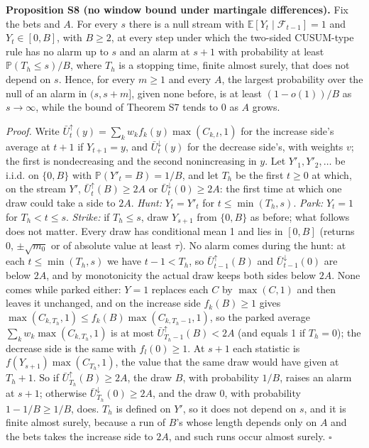 \documentclass[
]{article}
\begin{document}
\textbf{Proposition S8 (no window bound under martingale differences).}
Fix the bets and \(A\). For every \(s\) there is a null stream with
\(\mathbb{E}[Y_t \mid \mathcal{F}_{t-1}] = 1\) and \(Y_t \in [0, B]\),
with \(B \ge 2\), at every step under which the two-sided CUSUM-type
rule has no alarm up to \(s\) and an alarm at \(s + 1\) with probability
at least \(\mathbb{P}(T_h \le s)/B\), where \(T_h\) is a stopping time,
finite almost surely, that does not depend on \(s\). Hence, for every
\(m \ge 1\) and every \(A\), the largest probability over the null of an
alarm in \((s, s + m]\), given none before, is at least \((1 - o(1))/B\)
as \(s \to \infty\), while the bound of Theorem S7 tends to 0 as \(A\)
grows.

\emph{Proof.} Write
\(\bar U^{\uparrow}_t(y) = \sum_k w_k f_k(y)\max(C_{k,t}, 1)\) for the
increase side's average at \(t + 1\) if \(Y_{t+1} = y\), and
\(\bar U^{\downarrow}_t(y)\) for the decrease side's, with weights
\(v\); the first is nondecreasing and the second nonincreasing in \(y\).
Let \(Y'_1, Y'_2, \dots\) be i.i.d. on \(\lbrace 0, B\rbrace\) with
\(\mathbb{P}(Y'_t = B) = 1/B\), and let \(T_h\) be the first \(t \ge 0\)
at which, on the stream \(Y'\), \(\bar U^{\uparrow}_t(B) \ge 2A\) or
\(\bar U^{\downarrow}_t(0) \ge 2A\): the first time at which one draw
could take a side to \(2A\). \emph{Hunt:} \(Y_t = Y'_t\) for
\(t \le \min(T_h, s)\). \emph{Park:} \(Y_t = 1\) for \(T_h < t \le s\).
\emph{Strike:} if \(T_h \le s\), draw \(Y_{s+1}\) from
\(\lbrace 0, B\rbrace\) as before; what follows does not matter. Every
draw has conditional mean 1 and lies in \([0, B]\) (returns 0,
\(\pm\sqrt{m_0}\) or of absolute value at least \(\tau\)). No alarm
comes during the hunt: at each \(t \le \min(T_h, s)\) we have
\(t - 1 < T_h\), so \(\bar U^{\uparrow}_{t-1}(B)\) and
\(\bar U^{\downarrow}_{t-1}(0)\) are below \(2A\), and by monotonicity
the actual draw keeps both sides below \(2A\). None comes while parked
either: \(Y = 1\) replaces each \(C\) by \(\max(C, 1)\) and then leaves
it unchanged, and on the increase side \(f_k(B) \ge 1\) gives
\(\max(C_{k,T_h}, 1) \le f_k(B)\max(C_{k,T_h - 1}, 1)\), so the parked
average \(\sum_k w_k\max(C_{k,T_h}, 1)\) is at most
\(\bar U^{\uparrow}_{T_h - 1}(B) < 2A\) (and equals 1 if \(T_h = 0\));
the decrease side is the same with \(f_l(0) \ge 1\). At \(s + 1\) each
statistic is \(f(Y_{s+1})\max(C_{T_h}, 1)\), the value that the same
draw would have given at \(T_h + 1\). So if
\(\bar U^{\uparrow}_{T_h}(B) \ge 2A\), the draw \(B\), with probability
\(1/B\), raises an alarm at \(s + 1\); otherwise
\(\bar U^{\downarrow}_{T_h}(0) \ge 2A\), and the draw 0, with
probability \(1 - 1/B \ge 1/B\), does. \(T_h\) is defined on \(Y'\), so
it does not depend on \(s\), and it is finite almost surely, because a
run of \(B\)'s whose length depends only on \(A\) and the bets takes the
increase side to \(2A\), and such runs occur almost surely. \(\square\)
\end{document}
